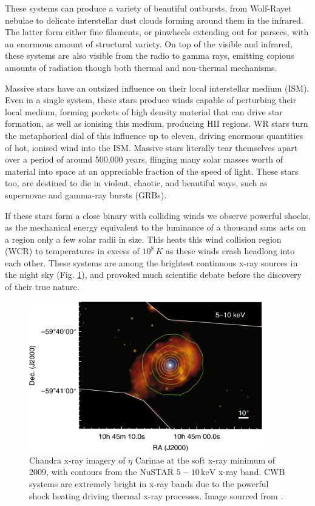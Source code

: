 These systems can produce a variety of beautiful outbursts, from Wolf-Rayet nebulae to delicate interstellar dust clouds forming around them in the infrared.
The latter form either fine filaments, or pinwheels extending out for parsecs, with an enormous amount of structural variety.
On top of the visible and infrared, these systems are also visible from the radio to gamma rays, emitting copious amounts of radiation though both thermal and non-thermal mechanisms.

Massive stars have an outsized influence on their local interstellar medium (ISM).
Even in a single system, these stars produce winds capable of perturbing their local medium, forming pockets of high density material that can drive star formation, as well as ionising this medium, producing HII regions.
WR stars turn the metaphorical dial of this influence up to eleven, driving enormous quantities of hot, ionised wind into the ISM.
Massive stars literally tear themselves apart over a period of around 500,000 years, flinging many solar masses worth of material into space at an appreciable fraction of the speed of light.
These stars too, are destined to die in violent, chaotic, and beautiful ways, such as supernovae and gamma-ray bursts (GRBs).

If these stars form a close binary with colliding winds we observe powerful shocks, as the mechanical energy equivalent to the luminance of a thousand suns acts on a region only a few solar radii in size.
This heats this wind collision region (WCR) to temperatures in excess of $10^8 \, \si{K}$ as these winds crash headlong into each other.
These systems are among the brightest continuous x-ray sources in the night sky (Fig. \ref{fig:intro-xray}), and provoked much scientific debate before the discovery of their true nature. 

\begin{figure}[ht]
  \centering
  \includegraphics[width=4in]{assets/wolf-rayets/x-ray.png}
  \caption[\emph{Chandra \& NuSTAR imagery of $\eta$ Carinae \parencite{hamaguchiNonthermalXraysColliding2018}}]{Chandra x-ray imagery of $\eta$ Carinae at the soft x-ray minimum of 2009, with contours from the NuSTAR $5-10 \, \si{\kilo\electronvolt}$ x-ray band. CWB systems are extremely bright in x-ray bands due to the powerful shock heating driving thermal x-ray processes. Image sourced from \textcite{hamaguchiNonthermalXraysColliding2018}.}
  \label{fig:intro-xray}
\end{figure}

